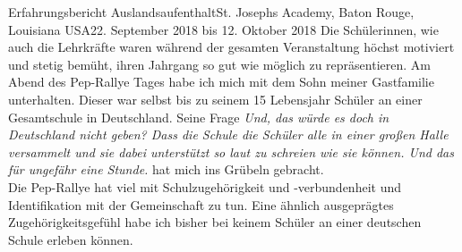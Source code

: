 \documentclass[oneside,openany,headings=optiontotoc,11pt,numbers=noenddot]{article}
\begin{document}
\begin{worksheet}{Erfahrungsbericht Auslandsaufenthalt}{St. Joseph\grq{}s Academy, Baton Rouge, Louisiana USA}{22. September 2018 bis 12. Oktober 2018}
		Die Schülerinnen, wie auch die Lehrkräfte waren während der gesamten Veranstaltung höchst motiviert und stetig bemüht, ihren Jahrgang so gut wie möglich zu repräsentieren.
		\small{Am Abend des Pep-Rallye Tages habe ich mich mit dem Sohn meiner Gastfamilie unterhalten. Dieser war selbst bis zu seinem 15 Lebensjahr Schüler an einer Gesamtschule in Deutschland. Seine Frage \glqq{}\textit{Und, das würde es doch in Deutschland nicht geben? Dass die Schule die Schüler alle in einer großen Halle versammelt und sie dabei unterstützt so laut zu schreien wie sie können. Und das für ungefähr eine Stunde.}\grqq{} hat mich ins Grübeln gebracht.\\
		Die Pep-Rallye hat viel mit Schulzugehörigkeit und -verbundenheit und Identifikation mit der Gemeinschaft zu tun. Eine ähnlich ausgeprägtes Zugehörigkeitsgefühl habe ich bisher bei keinem Schüler an einer deutschen Schule erleben können.}\\

\end{worksheet}
\end{document}
